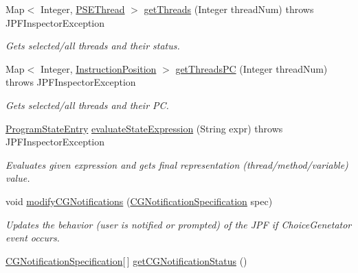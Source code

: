 \begin{DoxyCompactItemize}
\item 
Map$<$ Integer, \hyperlink{classgov_1_1nasa_1_1jpf_1_1inspector_1_1common_1_1pse_1_1_p_s_e_thread}{P\+S\+E\+Thread} $>$ \hyperlink{classgov_1_1nasa_1_1jpf_1_1inspector_1_1server_1_1jpf_1_1_j_p_f_inspector_parallel_ae040c9551b8ab27f2cfa0e08e674b861}{get\+Threads} (Integer thread\+Num)  throws J\+P\+F\+Inspector\+Exception 
\begin{DoxyCompactList}\small\item\em Gets selected/all threads and their status. \end{DoxyCompactList}\item 
Map$<$ Integer, \hyperlink{interfacegov_1_1nasa_1_1jpf_1_1inspector_1_1interfaces_1_1_instruction_position}{Instruction\+Position} $>$ \hyperlink{classgov_1_1nasa_1_1jpf_1_1inspector_1_1server_1_1jpf_1_1_j_p_f_inspector_parallel_a147ef13fc43c918ac13e90630d6ff73f}{get\+Threads\+PC} (Integer thread\+Num)  throws J\+P\+F\+Inspector\+Exception 
\begin{DoxyCompactList}\small\item\em Gets selected/all threads and their PC. \end{DoxyCompactList}\item 
\hyperlink{classgov_1_1nasa_1_1jpf_1_1inspector_1_1common_1_1pse_1_1_program_state_entry}{Program\+State\+Entry} \hyperlink{classgov_1_1nasa_1_1jpf_1_1inspector_1_1server_1_1jpf_1_1_j_p_f_inspector_parallel_a6b844731ae2bc8d6934ad1c731dce319}{evaluate\+State\+Expression} (String expr)  throws J\+P\+F\+Inspector\+Exception 
\begin{DoxyCompactList}\small\item\em Evaluates given expression and gets final representation (thread/method/variable) value. \end{DoxyCompactList}\item 
void \hyperlink{classgov_1_1nasa_1_1jpf_1_1inspector_1_1server_1_1jpf_1_1_j_p_f_inspector_parallel_a6baa1fa8e39d23eda34c5bcf30b10670}{modify\+C\+G\+Notifications} (\hyperlink{classgov_1_1nasa_1_1jpf_1_1inspector_1_1interfaces_1_1_choice_generators_interface_1_1_c_g_notification_specification}{C\+G\+Notification\+Specification} spec)
\begin{DoxyCompactList}\small\item\em Updates the behavior (user is notified or prompted) of the J\+PF if Choice\+Genetator event occurs. \end{DoxyCompactList}\item 
\hyperlink{classgov_1_1nasa_1_1jpf_1_1inspector_1_1interfaces_1_1_choice_generators_interface_1_1_c_g_notification_specification}{C\+G\+Notification\+Specification}\mbox{[}$\,$\mbox{]} \hyperlink{classgov_1_1nasa_1_1jpf_1_1inspector_1_1server_1_1jpf_1_1_j_p_f_inspector_parallel_ae72933c9a7a67957f3575fea99f8a4ab}{get\+C\+G\+Notification\+Status} ()

\end{DoxyCompactItemize}
